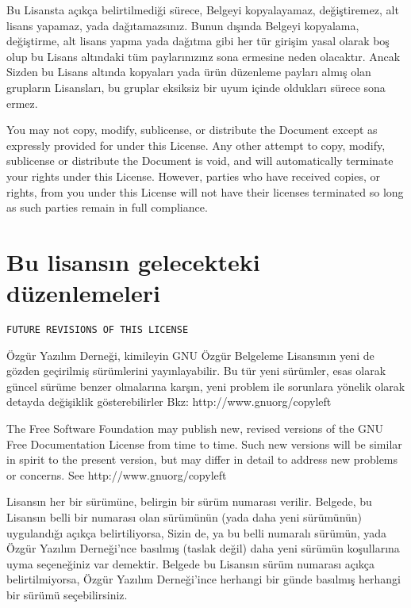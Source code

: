 \begin{multicols}{2}
Bu Lisansta açıkça belirtilmediği sürece, Belgeyi kopyalayamaz, değiştiremez, alt lisans yapamaz, yada dağıtamazsınız. Bunun dışında Belgeyi kopyalama, değiştirme, alt lisans yapma yada dağıtma gibi her tür girişim yasal olarak boş olup bu Lisans altındaki tüm paylarınızınz sona ermesine neden olacaktır. Ancak Sizden bu Lisans altında kopyaları yada ürün düzenleme payları almış olan grupların Lisansları, bu gruplar eksiksiz bir uyum içinde oldukları sürece sona ermez.
\begin{ingliz}You may not copy, modify, sublicense, or distribute the
Document except as expressly provided for under this License.
Any other attempt to copy, modify, sublicense or distribute
the Document is void, and will automatically terminate your
rights under this License.  However, parties who have received
copies, or rights, from you under this License will not have
their licenses terminated so long as such parties remain in
full compliance.\end{ingliz}

\section{Bu lisansın gelecekteki düzenlemeleri}\hfill\begin{verbatim}FUTURE REVISIONS OF THIS LICENSE\end{verbatim}\label{gfdl-10}
Özgür Yazılım Derneği, kimileyin GNU Özgür Belgeleme Lisansının yeni de gözden geçirilmiş sürümlerini yayınlayabilir. Bu tür yeni sürümler, esas olarak %
güncel %
sürüme benzer olmalarına karşın, %
yeni problem ile sorunlara yönelik olarak detayda değişiklik gösterebilirler %
Bkz: http://www.gnu\centerdot org/copyleft

\begin{ingliz}The Free Software Foundation may publish new, revised
versions of the GNU Free Documentation License from time to
time.  Such new versions will be similar in spirit to the
present version, but may differ in detail to address new
problems or concerns.  See
http://www.gnu\centerdot org/copyleft\end{ingliz}

Lisansın her bir sürümüne, belirgin bir sürüm numarası verilir. Belgede, bu Lisansın belli bir numarası olan sürümünün (yada daha yeni sürümünün) uygulandığı açıkça belirtiliyorsa, Sizin de, ya bu belli numaralı sürümün, yada Özgür Yazılım Derneği'nce basılmış (taslak değil) daha yeni sürümün koşullarına uyma seçeneğiniz var demektir. Belgede bu Lisansın sürüm numarası açıkça belirtilmiyorsa, Özgür Yazılım Derneği'ince herhangi bir günde basılmış herhangi bir sürümü seçebilirsiniz.


\end{multicols}
